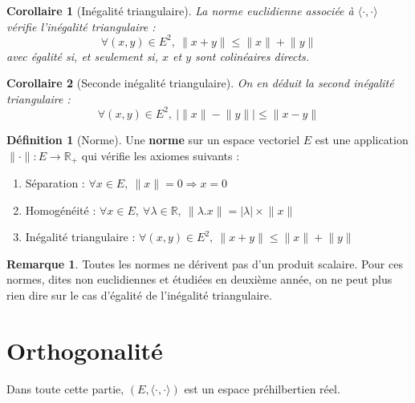 \documentclass[french]{book}
\newcommand{\R}{\mathbb{R}}
\theoremstyle{plain}
\newtheorem{cor}{Corollaire}[chapter]
\theoremstyle{definition}
\newtheorem{dfn}{Définition}[chapter]
\newtheorem{rmq}{Remarque}[chapter]
\theoremstyle{remark}
\begin{document}
\begin{cor}[Inégalité triangulaire]
	La norme euclidienne associée à $\langle\cdot,\cdot\rangle$ vérifie l'inégalité triangulaire : $$\forall (x,y)\in E^2,\ \lVert x+y\rVert\leqslant\lVert x\rVert+\lVert y\rVert$$ avec égalité si, et seulement si, $x$ et $y$ sont colinéaires directs. 
\end{cor}
\begin{cor}[Seconde inégalité triangulaire]
	On en déduit la second inégalité triangulaire : $$\forall (x,y)\in E^2,\ \big|\lVert x\rVert - \lVert y\rVert\big| \leqslant \lVert x-y\rVert$$
\end{cor}
\begin{dfn}[Norme]
	Une \textbf{norme} sur un espace vectoriel $E$ est une application $\lVert\cdot\rVert:E\rightarrow\R_+$ qui vérifie les axiomes suivants :
	\begin{enumerate}
		\item Séparation : $\forall x\in E,\ \lVert x\rVert=0 \Rightarrow x=0$
		\item Homogénéité : $\forall x\in E,\  \forall \lambda\in\R,\ \lVert \lambda.x\rVert=\lvert\lambda\rvert\times\lVert x\rVert$
		\item Inégalité triangulaire : $\forall (x,y)\in E^2,\ \lVert x+y\rVert\leqslant\lVert x\rVert+\lVert y\rVert$
	\end{enumerate}
\end{dfn}
\begin{rmq} Toutes les normes ne dérivent pas d'un produit scalaire. Pour ces normes, dites non euclidiennes et étudiées en deuxième année, on ne peut plus rien dire sur le cas d'égalité de l'inégalité triangulaire. \end{rmq}

\section{Orthogonalité}
Dans toute cette partie, $(E,\langle\cdot,\cdot\rangle)$ est un espace préhilbertien réel.
\end{document}
